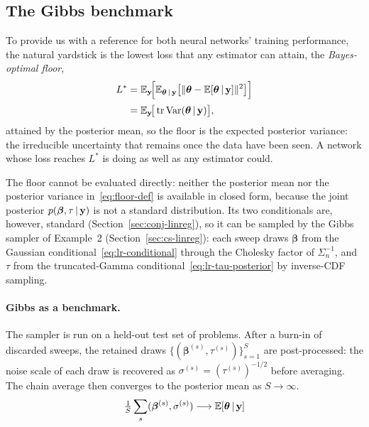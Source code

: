 \subsection{The Gibbs benchmark}
\label{sec:bayes-floor}

To provide us with a reference for both neural networks' training performance,
 the natural yardstick is the lowest loss that any
estimator can attain, the \emph{Bayes-optimal floor},
%
\begin{align}
  L^{*}
  &= \mathbb{E}_{\mathbf{y}}\!\Big[
     \mathbb{E}_{\bm{\theta} \,|\, \mathbf{y}}
     \big[\|\bm{\theta}
     - \mathbb{E}[\bm{\theta} \,|\, \mathbf{y}]\|^2\big]\Big]
   \notag\\[2pt]
  &= \mathbb{E}_{\mathbf{y}}\!\big[\operatorname{tr}\operatorname{Var}(\bm{\theta} \,|\, \mathbf{y})\big],
  \label{eq:floor-def}
\end{align}
%
attained by the posterior mean, so the floor is
the expected posterior variance: the irreducible uncertainty that
remains once the data have been seen. A network whose loss reaches
$L^{*}$ is doing as well as any estimator could.

The floor cannot be evaluated directly: neither the posterior mean
nor the posterior variance in~\eqref{eq:floor-def} is available in
closed form, because the joint posterior
$p(\bm{\beta}, \tau \,|\, \mathbf{y})$ is not a standard
distribution. Its two conditionals are, however, standard
(Section~\ref{sec:conj-linreg}), so it can be sampled by the Gibbs
sampler of Example~2 (Section~\ref{sec:cs-linreg}): each sweep draws
$\bm{\beta}$ from the
Gaussian conditional~\eqref{eq:lr-conditional} through the Cholesky
factor of $\Sigma_n^{-1}$, and $\tau$ from the truncated-Gamma
conditional~\eqref{eq:lr-tau-posterior} by inverse-CDF sampling.

\paragraph{Gibbs as a benchmark.}
The sampler is run on a held-out test set of problems. After a
burn-in of discarded sweeps, the retained draws
$\{(\bm{\beta}^{(s)}, \tau^{(s)})\}_{s=1}^{S}$ are post-processed: the
noise scale of each draw is recovered as
$\sigma^{(s)} = (\tau^{(s)})^{-1/2}$ before averaging. The chain average then converges to the posterior mean as
$S \to \infty$.
\begin{align}
  \tfrac{1}{S}\sum_s (\bm{\beta}^{(s)}, \sigma^{(s)}) \longrightarrow \mathbb{E}[\bm{\theta} \,|\, \mathbf{y}]
\end{align}

